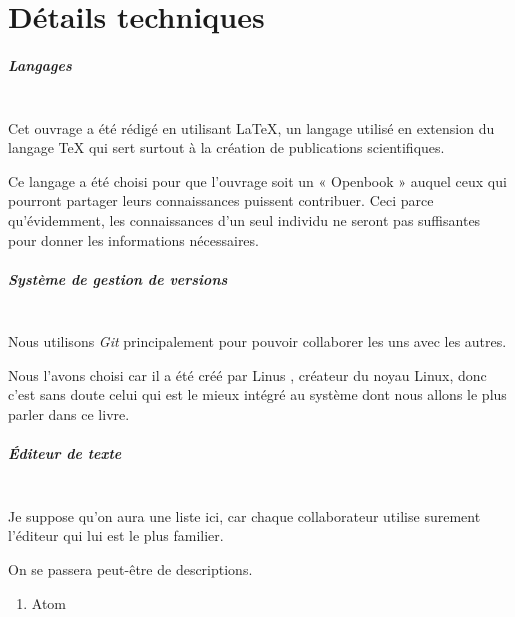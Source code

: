 \chapter{Détails techniques}

\paragraph{Langages} ~\\

Cet ouvrage a été rédigé en utilisant \LaTeX{}, un langage utilisé en extension
du langage \TeX{} qui sert surtout à la création de publications scientifiques.

Ce langage a été choisi pour que l'ouvrage soit un « Openbook » auquel
ceux qui pourront partager leurs connaissances puissent contribuer. Ceci parce
qu'évidemment, les connaissances d'un seul individu ne seront pas suffisantes
pour donner les informations nécessaires.

\paragraph{Système de gestion de versions} ~\\

Nous utilisons \emph{Git} principalement pour pouvoir collaborer les uns avec
les autres.

Nous l'avons choisi car il a été créé par Linus , créateur du
noyau Linux, donc c'est sans doute celui qui est le mieux intégré au système
dont nous allons le plus parler dans ce livre.

\paragraph{Éditeur de texte} ~\\

Je suppose qu'on aura une liste ici, car chaque collaborateur utilise surement
l'éditeur qui lui est le plus familier.

On se passera peut-être de descriptions.

\begin{enumerate}
  \item Atom
\end{enumerate}
